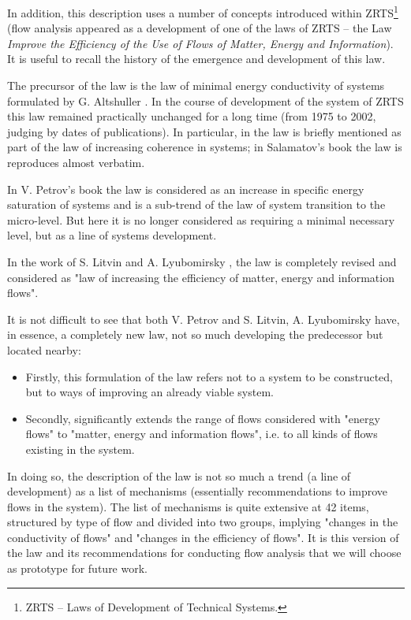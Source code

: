 \documentclass[a4paper,11pt]{article}
\begin{document}
In addition, this description uses a number of concepts introduced within
ZRTS\footnote{ZRTS -- Laws of Development of Technical Systems.}  (flow
analysis appeared as a development of one of the laws of ZRTS -- the Law
\emph{Improve the Efficiency of the Use of Flows of Matter, Energy and
  Information}). It is useful to recall the history of the emergence and
development of this law.

The precursor of the law is the law of minimal energy conductivity of systems
formulated by G. Altshuller \cite{3}. In the course of development of the
system of ZRTS this law remained practically unchanged for a long time (from
1975 to 2002, judging by dates of publications). In particular, in
\cite[p. 56]{4} the law is briefly mentioned as part of the law of increasing
coherence in systems; in Salamatov's book \cite{5} the law is reproduces
almost verbatim.

In V. Petrov's book \cite{6} the law is considered as an increase in specific
energy saturation of systems and is a sub-trend of the law of system
transition to the micro-level. But here it is no longer considered as
requiring a minimal necessary level, but as a line of systems development.

In the work of S. Litvin and A. Lyubomirsky \cite{7}, the law is completely
revised and considered as "law of increasing the efficiency of matter, energy
and information flows".

It is not difficult to see that both V. Petrov and S. Litvin, A. Lyubomirsky
have, in essence, a completely new law, not so much developing the predecessor
but located nearby:
\begin{itemize}
\item Firstly, this formulation of the law refers not to a system to be
  constructed, but to ways of improving an already viable system.
\item Secondly, \cite{7} significantly extends the range of flows considered
  with "energy flows" to "matter, energy and information flows", i.e. to all
  kinds of flows existing in the system.
\end{itemize}
In doing so, the description of the law is not so much a trend (a line of
development) as a list of mechanisms (essentially recommendations to improve
flows in the system).  The list of mechanisms is quite extensive at 42 items,
structured by type of flow and divided into two groups, implying "changes in
the conductivity of flows" and "changes in the efficiency of flows". It is
this version of the law and its recommendations for conducting flow analysis
that we will choose as prototype for future work.
\end{document}

